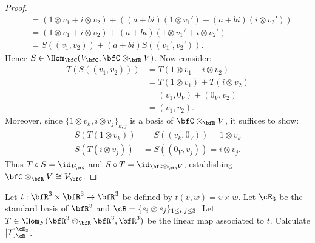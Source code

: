 \documentclass[10pt,twoside,openany]{memoir}
\begin{document}
\begin{proof}
\begin{equation*}
\begin{split}
                    & = (1\otimes v_1 + i \otimes v_2) + ((a+bi)(1 \otimes v_1') + (a+bi)(i \otimes v_2')) \\
                    & = (1\otimes v_1 + i \otimes v_2) + (a+bi)(1 \otimes v_1' + i \otimes v_2') \\
                    & = S((v_1,v_2)) + (a+bi)S((v_1',v_2')).
                \end{split}
                \end{equation*}
            Hence $S \in \Hom_\bfC(V_\bfC, \bfC \otimes_\bfR V)$. Now consider:
                \begin{equation*}
                \begin{split}
                    T(S((v_1,v_2)))
                    & = T(1 \otimes v_1 + i \otimes v_2) \\
                    & = T(1 \otimes v_1) + T(i \otimes v_2) \\
                    & = (v_1,0_V) + (0_V,v_2) \\
                    & = (v_1,v_2).
                \end{split}
                \end{equation*}
            Moreover, since $\{1 \otimes v_k , i \otimes v_j\}_{k,j}$ is a basis of $\bfC \otimes_\bfR V$, it suffices to show:
                \begin{equation*}
                \begin{split}
                    S(T(1 \otimes v_k)) &= S((v_k,0_V)) = 1 \otimes v_k \\
                    S(T(i \otimes v_j)) &= S((0_V,v_j)) = i \otimes v_j.
                \end{split}
                \end{equation*}
            Thus $T \circ S = \id_{V_\bfC}$ and $S \circ T = \id_{\bfC \otimes_\bfR V}$, establishing $\bfC \otimes_\bfR V \cong V_\bfC$.
        \end{proof}
    \begin{exercise}
        Let $t: \bfR^3 \times \bfR^3 \rightarrow \bfR^3$ be defined by $t(v,w) = v \times w$. Let $\cE_3$ be the standard basis of $\bfR^3$ and $\cB = \{e_i \otimes e_j\}_{1 \leq i,j \leq 3}$. Let $T \in \Hom_F(\bfR^3 \otimes_\bfR \bfR^3 , \bfR^3)$ be the linear map associated to $t$. Calculate $\left[T\right]_\cB^{\cE_3}$.
    \end{exercise}
\end{document}
